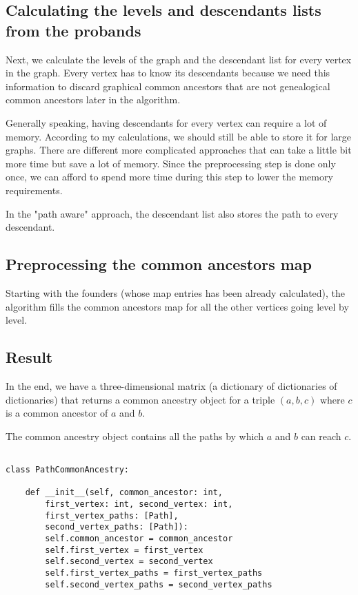 \documentclass[14pt]{extarticle}
\begin{document}
\subsection{Calculating the levels and descendants lists from the probands}

Next, we calculate the levels of the graph and the descendant list for every vertex in the graph. Every vertex has to know its descendants because we need this information to discard graphical common ancestors that are not genealogical common ancestors later in the algorithm.

Generally speaking, having descendants for every vertex can require a lot of memory. According to my calculations, we should still be able to store it for large graphs. There are different more complicated approaches that can take a little bit more time but save a lot of memory. Since the preprocessing step is done only once, we can afford to spend more time during this step to lower the memory requirements.

In the "path aware" approach, the descendant list also stores the path to every descendant.

\subsection{Preprocessing the common ancestors map}

Starting with the founders (whose map entries has been already calculated), the algorithm fills the common ancestors map for all the other vertices going level by level.

\subsection{Result}

In the end, we have a three-dimensional matrix (a dictionary of dictionaries of dictionaries) that returns a common ancestry object for a triple $(a, b, c)$ where $c$ is a common ancestor of $a$ and $b$.

The common ancestry object contains all the paths by which $a$ and $b$ can reach $c$.

\begin{lstlisting}

class PathCommonAncestry:
	
	def __init__(self, common_ancestor: int,
		first_vertex: int, second_vertex: int,
		first_vertex_paths: [Path],
		second_vertex_paths: [Path]):
		self.common_ancestor = common_ancestor
		self.first_vertex = first_vertex
		self.second_vertex = second_vertex
		self.first_vertex_paths = first_vertex_paths
		self.second_vertex_paths = second_vertex_paths
	

\end{lstlisting}
\end{document}
